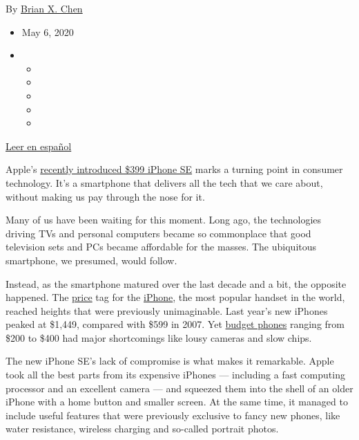 By \href{https://www.nytimes3xbfgragh.onion/by/brian-x-chen}{Brian X.
Chen}

\begin{itemize}
\item
  May 6, 2020
\item
  \begin{itemize}
  \item
  \item
  \item
  \item
  \item
  \end{itemize}
\end{itemize}

\href{https://www.nytimes3xbfgragh.onion/es/2020/05/08/espanol/ciencia-y-tecnologia/iphone-SE.html}{Leer
en español}

Apple's
\href{https://www.nytimes3xbfgragh.onion/2020/04/15/technology/personaltech/apple-new-iphone-se.html}{recently
introduced \$399 iPhone SE} marks a turning point in consumer
technology. It's a smartphone that delivers all the tech that we care
about, without making us pay through the nose for it.

Many of us have been waiting for this moment. Long ago, the technologies
driving TVs and personal computers became so commonplace that good
television sets and PCs became affordable for the masses. The ubiquitous
smartphone, we presumed, would follow.

Instead, as the smartphone matured over the last decade and a bit, the
opposite happened. The
\href{https://www.nytimes3xbfgragh.onion/article/iphone-costs.html}{price}
tag for the
\href{https://www.nytimes3xbfgragh.onion/article/iphone-costs.html}{iPhone},
the most popular handset in the world, reached heights that were
previously unimaginable. Last year's new iPhones peaked at \$1,449,
compared with \$599 in 2007. Yet
\href{https://www.nytimes3xbfgragh.onion/2018/02/28/technology/personaltech/cheaper-smartphone.html}{budget
phones} ranging from \$200 to \$400 had major shortcomings like lousy
cameras and slow chips.

The new iPhone SE's lack of compromise is what makes it remarkable.
Apple took all the best parts from its expensive iPhones --- including a
fast computing processor and an excellent camera --- and squeezed them
into the shell of an older iPhone with a home button and smaller screen.
At the same time, it managed to include useful features that were
previously exclusive to fancy new phones, like water resistance,
wireless charging and so-called portrait photos.

